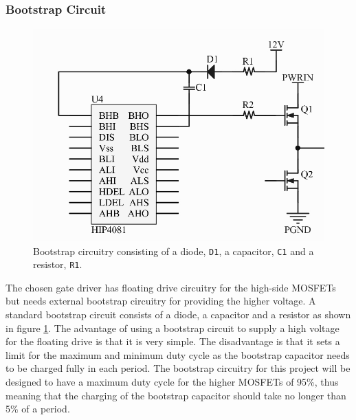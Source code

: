 \subsubsection{Bootstrap Circuit}
\label{ssub:bootstrap_circuit}
\begin{figure}[h]
	\centering
	\includegraphics[width=0.6\linewidth]{graphics/hip_bootstrap}
	\caption[Bootstrap circuitry]{Bootstrap circuitry consisting of a diode, \texttt{D1}, a capacitor, \texttt{C1} and a resistor, \texttt{R1}. }
	\label{fig:hip_bootstrap}
\end{figure}	
The chosen gate driver has floating drive circuitry for the high-side MOSFETs but needs external bootstrap circuitry for providing the higher voltage. 
A standard bootstrap circuit consists of a diode, a capacitor and a resistor as shown in figure \ref{fig:hip_bootstrap}.
The advantage of using a bootstrap circuit to supply a high voltage for the floating drive is that it is very simple. 
The disadvantage is that it sets a limit for the maximum and minimum duty cycle as the bootstrap capacitor needs to be charged fully in each period.
The bootstrap circuitry for this project will be designed to have a maximum duty cycle for the higher MOSFETs of 95\%, thus meaning that the charging of the bootstrap capacitor should take no longer than 5\% of a period.  

